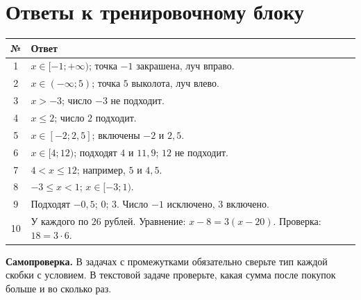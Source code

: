 \documentclass[a4paper,12pt]{article}
\newcommand{\headingrule}{\vspace{-0.5em}{\color{accent}\hrule height 0.55pt}\vspace{0.5em}}
\newcommand{\key}[1]{\textbf{\color{darkaccent}#1}}
\begin{document}
\section*{Ответы к тренировочному блоку}
\headingrule
\begin{center}
\renewcommand{\arraystretch}{1.7}
\begin{tabularx}{\linewidth}{@{}c X@{}}
\toprule
\textbf{№} & \textbf{Ответ}\\
\midrule
1 & $x\in[-1;+\infty)$; точка $-1$ закрашена, луч вправо.\\
2 & $x\in(-\infty;5)$; точка $5$ выколота, луч влево.\\
3 & $x>-3$; число $-3$ не подходит.\\
4 & $x\le 2$; число $2$ подходит.\\
5 & $x\in[-2;2{,}5]$; включены $-2$ и $2{,}5$.\\
6 & $x\in[4;12)$; подходят $4$ и $11{,}9$; $12$ не подходит.\\
7 & $4<x\le 12$; например, $5$ и $4{,}5$.\\
8 & $-3\le x<1$; $x\in[-3;1)$.\\
9 & Подходят $-0{,}5$; $0$; $3$. Число $-1$ исключено, $3$ включено.\\
10 & У каждого по $26$ рублей. Уравнение: $x-8=3(x-20)$. Проверка: $18=3\cdot 6$.\\
\bottomrule
\end{tabularx}
\end{center}
\vspace{1.2em}
\key{Самопроверка.} В задачах с промежутками обязательно сверьте тип каждой скобки с условием. В текстовой задаче проверьте, какая сумма после покупок больше и во сколько раз.
\end{document}
